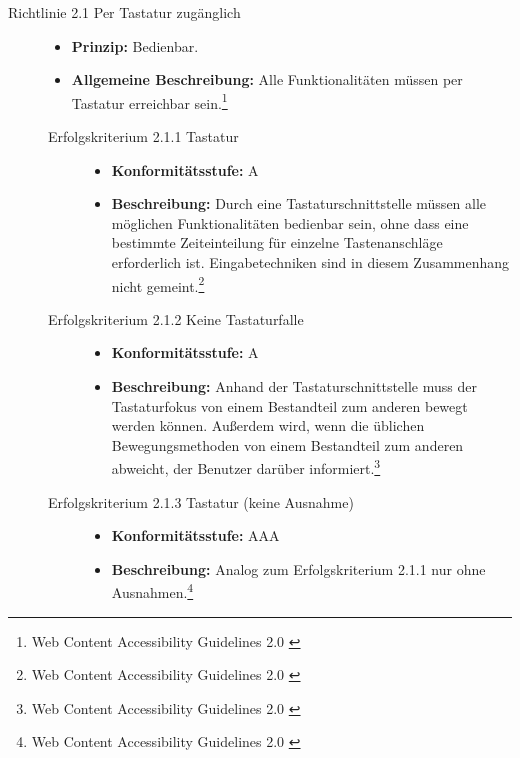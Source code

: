\begin{description}
	\item[Richtlinie 2.1 Per Tastatur zugänglich]\hfill
	\begin{itemize}
		\item \textbf{Prinzip:} Bedienbar.
		\item \textbf{Allgemeine Beschreibung:} Alle Funktionalitäten müssen per Tastatur erreichbar sein.\footnote{Web Content Accessibility Guidelines 2.0 \cite{WCAG2.0}}
	\end{itemize}
	
	\begin{description}
		\item[Erfolgskriterium 2.1.1 Tastatur]\hfill
		\begin{itemize}
			\item \textbf{Konformitätsstufe:} A
			\item \textbf{Beschreibung:} Durch eine Tastaturschnittstelle müssen alle möglichen Funktionalitäten bedienbar sein, ohne dass eine bestimmte 
			Zeiteinteilung für einzelne Tastenanschläge erforderlich ist. Eingabetechniken sind in diesem Zusammenhang nicht 
			gemeint.\footnote{Web Content Accessibility Guidelines 2.0 \cite{WCAG2.0}}
		\end{itemize}
		
		\item[Erfolgskriterium 2.1.2 Keine Tastaturfalle]\hfill
		\begin{itemize}
			\item \textbf{Konformitätsstufe:} A
			\item \textbf{Beschreibung:} Anhand der Tastaturschnittstelle muss der Tastaturfokus von einem Bestandteil zum anderen bewegt werden können. Außerdem wird, wenn 
			die üblichen Bewegungsmethoden von einem Bestandteil zum anderen abweicht, der Benutzer darüber informiert.\footnote{Web Content Accessibility Guidelines 2.0 \cite{WCAG2.0}}
		\end{itemize}
		
		\item[Erfolgskriterium 2.1.3 Tastatur (keine Ausnahme)]\hfill
		\begin{itemize}
			\item \textbf{Konformitätsstufe:} AAA
			\item \textbf{Beschreibung:} Analog zum Erfolgskriterium 2.1.1 nur ohne Ausnahmen.\footnote{Web Content Accessibility Guidelines 2.0 \cite{WCAG2.0}}
		\end{itemize}
	\end{description}
	

\end{description}
